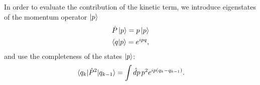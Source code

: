 \documentclass{article}
\numberwithin{equation}{section}
\begin{document}
In order to evaluate the contribution of the kinetic term, we introduce eigenstates of the momentum operator $\ket{p}$
\begin{gather}
    \hat{P} \ket{p} = p \ket{p} \\
    \braket{q}{p} = e^{ipq},
\end{gather}
and use the completeness of the states $\ket{p}$:
\begin{equation}
    \mel{q_k}{\hat{P}^2}{q_{k-1}} = \int \hat{d}p\, p^2 e^{ip(q_k - q_{k-1})}.
\end{equation}
\end{document}
